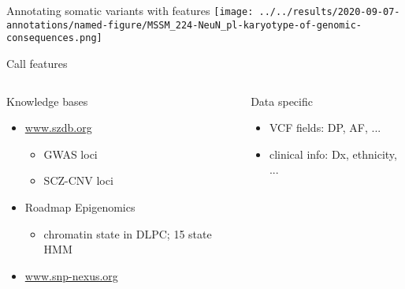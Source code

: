 \documentclass[usenames,dvipsnames]{beamer}
\begin{document}
\begin{frame}{Annotating somatic variants with features}
\texttt{[image: ../../results/2020-09-07-annotations/named-figure/MSSM\_224-NeuN\_pl-karyotype-of-genomic-consequences.png]}
\end{frame}

\begin{frame}{Call features}
\begin{columns}[t]
\begin{column}{0.5\textwidth}
	Knowledge bases
\begin{itemize}
\item \url{www.szdb.org}
\begin{itemize}
\item GWAS loci
\item SCZ-CNV loci
\end{itemize}
\item Roadmap Epigenomics
\begin{itemize}
\item chromatin state in DLPC; 15 state HMM
\end{itemize}
\item \url{www.snp-nexus.org}
\end{itemize}
\end{column}

\begin{column}{0.5\textwidth}
	Data specific
\begin{itemize}
\item VCF fields: DP, AF, ...
\item clinical info: Dx, ethnicity, ...
\end{itemize}
\end{column}
\end{columns}
\end{frame}
\end{document}
